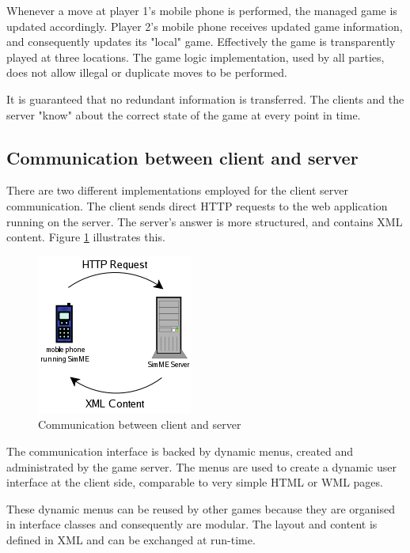 		Whenever a move at player 1's mobile phone is performed, the managed
		game is updated accordingly. Player 2's mobile phone receives updated
		game information, and consequently updates its "local" game. Effectively
		the game is transparently played at three locations. The game logic
		implementation, used by all parties, does not allow illegal or duplicate
		moves to be performed.

		It is guaranteed that no redundant information is transferred. The
		clients and the server "know" about the correct state of the game at
		every point in time.

	\subsection{Communication between client and server}

		There are two different implementations employed for the client server
		communication. The client sends direct HTTP requests to the web
		application running on the server. The server's answer is more
		structured, and contains XML content. Figure \ref{fig:com_client_server}
		illustrates this.

		\begin{figure}[h]
		\begin{center}
			\includegraphics{pics/com_client_server.png}
			\caption{Communication between client and server}
			\label{fig:com_client_server}
		\end{center}
		\end{figure}

		The communication interface is backed by dynamic menus, created and
		administrated by the game server. The menus are used to create a dynamic
		user interface at the client side, comparable to very simple HTML or WML
		pages.

		These dynamic menus can be reused by other games because they are
		organised in interface classes and consequently are modular. The layout
		and content is defined in XML and can be exchanged at run-time.


